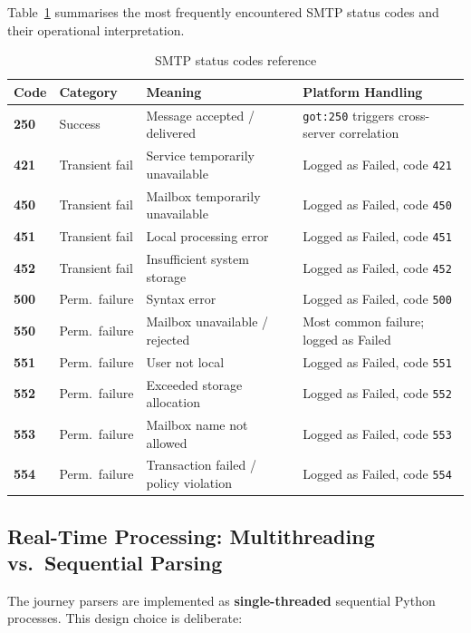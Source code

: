 \documentclass[12pt,a4paper,oneside]{report}
\newcommand{\rowA}{\rowcolor{rowgray}}
\begin{document}
Table~\ref{tab:smtp-codes} summarises the most frequently encountered SMTP status codes and their operational interpretation.

\begin{table}[H]
\centering
\caption{SMTP status codes reference}
\label{tab:smtp-codes}
\begin{tabularx}{\textwidth}{@{}>{\bfseries}p{1.4cm} p{2.2cm} X p{3cm}@{}}
\toprule
Code & Category & Meaning & Platform Handling \\
\midrule
\rowA 250 & Success & Message accepted / delivered & \texttt{got:250} triggers cross-server correlation \\
421 & Transient fail & Service temporarily unavailable & Logged as Failed, code \texttt{421} \\
\rowA 450 & Transient fail & Mailbox temporarily unavailable & Logged as Failed, code \texttt{450} \\
451 & Transient fail & Local processing error & Logged as Failed, code \texttt{451} \\
\rowA 452 & Transient fail & Insufficient system storage & Logged as Failed, code \texttt{452} \\
500 & Perm.\ failure & Syntax error & Logged as Failed, code \texttt{500} \\
\rowA 550 & Perm.\ failure & Mailbox unavailable / rejected & Most common failure; logged as Failed \\
551 & Perm.\ failure & User not local & Logged as Failed, code \texttt{551} \\
\rowA 552 & Perm.\ failure & Exceeded storage allocation & Logged as Failed, code \texttt{552} \\
553 & Perm.\ failure & Mailbox name not allowed & Logged as Failed, code \texttt{553} \\
\rowA 554 & Perm.\ failure & Transaction failed / policy violation & Logged as Failed, code \texttt{554} \\
\bottomrule
\end{tabularx}
\end{table}

\subsection{Real-Time Processing: Multithreading vs.\ Sequential Parsing}

The journey parsers are implemented as \textbf{single-threaded} sequential Python processes.
This design choice is deliberate:
\end{document}
